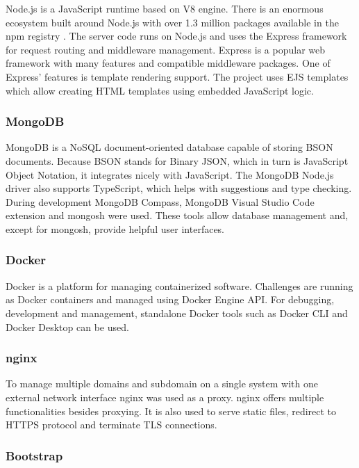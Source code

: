 Node.js is a JavaScript runtime based on V8 engine. There is an enormous ecosystem built around Node.js with over 1.3 million packages available in the npm registry \cite{bib:npm-packages}. The server code runs on Node.js and uses the Express framework for request routing and middleware management. Express is a popular web framework with many features and compatible middleware packages. One of Express' features is template rendering support. The project uses EJS templates which allow creating HTML templates using embedded JavaScript logic.

\subsubsection{MongoDB}

MongoDB is a NoSQL document-oriented database capable of storing BSON documents. Because BSON stands for Binary JSON, which in turn is JavaScript Object Notation, it integrates nicely with JavaScript. The MongoDB Node.js driver also supports TypeScript, which helps with suggestions and type checking.\\
During development MongoDB Compass, MongoDB Visual Studio Code extension and mongosh were used. These tools allow database management and, except for mongosh, provide helpful user interfaces.

\subsubsection{Docker}

Docker is a platform for managing containerized software. Challenges are running as Docker containers and managed using Docker Engine API. For debugging, development and management, standalone Docker tools such as Docker CLI and Docker Desktop can be used.

\subsubsection{nginx}

To manage multiple domains and subdomain on a single system with one external network interface nginx was used as a proxy. nginx offers multiple functionalities besides proxying. It is also used to serve static files, redirect to HTTPS protocol and terminate TLS connections.

\subsubsection{Bootstrap}

